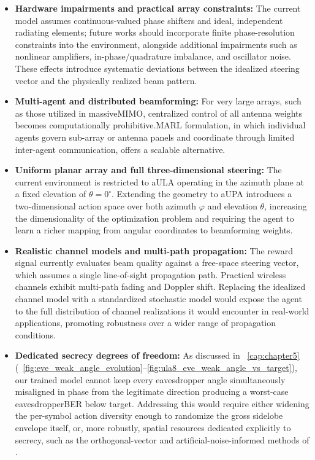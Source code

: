 \begin{itemize}
    \item \textbf{Hardware impairments and practical array constraints:} The current model assumes continuous-valued phase shifters and ideal, independent radiating elements; future works should incorporate finite phase-resolution constraints into the environment, alongside additional impairments such as nonlinear amplifiers, in-phase/quadrature imbalance, and oscillator noise. These effects introduce systematic deviations between the idealized steering vector and the physically realized beam pattern.
    \item \textbf{Multi-agent and distributed beamforming:} For very large arrays, such as those utilized in massive\gls{MIMO}, centralized control of all antenna weights becomes computationally prohibitive.\Gls{MARL} formulation, in which individual agents govern sub-array or antenna panels and coordinate through limited inter-agent communication, offers a scalable alternative.
    \item \textbf{Uniform planar array and full three-dimensional steering:} The current environment is restricted to a\gls{ULA} operating in the azimuth plane at a fixed elevation of $\theta = 0^\circ$. Extending the geometry to a\gls{UPA} introduces a two-dimensional action space over both azimuth $\varphi$ and elevation $\theta$, increasing the dimensionality of the optimization problem and requiring the agent to learn a richer mapping from angular coordinates to beamforming weights.
    \item \textbf{Realistic channel models and multi-path propagation:} The reward signal currently evaluates beam quality against a free-space steering vector, which assumes a single line-of-sight propagation path. Practical wireless channels exhibit multi-path fading and Doppler shift. Replacing the idealized channel model with a standardized stochastic model would expose the agent to the full distribution of channel realizations it would encounter in real-world applications, promoting robustness over a wider range of propagation conditions.
    \item \textbf{Dedicated secrecy degrees of freedom:} As discussed in \chaptername~\ref{cap:chapter5} (\figuresname~\ref{fig:eve_weak_angle_evolution}--\ref{fig:ula8_eve_weak_angle_vs_target}), our trained model cannot keep every eavesdropper angle simultaneously misaligned in phase from the legitimate direction producing a worst-case eavesdropper\gls{BER} below target. Addressing this would require either widening the per-symbol action diversity enough to randomize the gross sidelobe envelope itself, or, more robustly, spatial resources dedicated explicitly to secrecy, such as the orthogonal-vector and artificial-noise-informed methods of \cite{ding2015orthogonal}.
\end{itemize}

